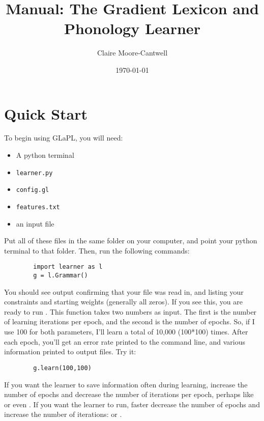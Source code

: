 \documentclass[12]{article}
\title{Manual: The Gradient Lexicon and Phonology Learner}
\author{Claire Moore-Cantwell}
\date{\today}
\begin{document}
\maketitle

\section{Quick Start}

To begin using GLaPL, you will need:
\begin{itemize}
\item A python terminal
\item \texttt{learner.py}
\item \texttt{config.gl}
\item \texttt{features.txt}
\item an input file
\end{itemize}

Put all of these files in the same folder on your computer, and point your python terminal to that folder.  Then, run the following commands:

	\begin{verbatim}
		import learner as l
		g = l.Grammar()
	\end{verbatim}

You should see output confirming that your file was read in, and listing your constraints and starting weights (generally all zeros).  If you see this, you are ready to run .  This function takes two numbers as input.  The first is the number of learning iterations per epoch, and the second is the number of epochs.  So, if I use 100 for both parameters, I'll learn a total of 10,000 (100*100) times.  After each epoch, you'll get an error rate printed to the command line, and various information printed to output files.  Try it:

	\begin{verbatim}
		g.learn(100,100)
	\end{verbatim}
	
If you want the learner to save information often during learning, increase the number of epochs and decrease the number of iterations per epoch, perhaps like  or even .  If you want the learner to run, faster decrease the number of epochs and increase the number of iterations:  or .
\end{document}
